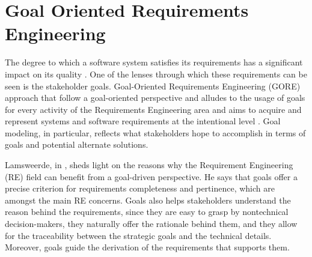 


\section{Goal Oriented Requirements Engineering} \label{sec:bgGORE}

The degree to which a software system satisfies its requirements has a significant impact on its quality \cite{Horkoff2019}. One of the lenses through which these requirements can be seen is the stakeholder goals. Goal-Oriented Requirements Engineering (GORE) approach that follow a goal-oriented perspective and alludes to the usage of goals for every activity of the Requirements Engineering area and aims to acquire and represent systems and software requirements at the intentional level \cite{van_lamsweerde_system_2003}. 
Goal modeling, in particular, reflects what stakeholders hope to accomplish in terms of goals and potential alternate solutions. 

Lamsweerde, in \cite{2001Lamsweerde}, sheds light on the reasons why the Requirement Engineering (RE) field can benefit from a goal-driven perspective. He says that goals offer a precise criterion for requirements completeness and pertinence, which are amongst the main RE concerns. Goals also helps stakeholders understand the reason behind the requirements, since they are easy to grasp by nontechnical decision-makers, they naturally offer the rationale behind them, and they allow for the traceability between the strategic goals and the technical details. Moreover, goals guide the derivation of the requirements that supports them.

